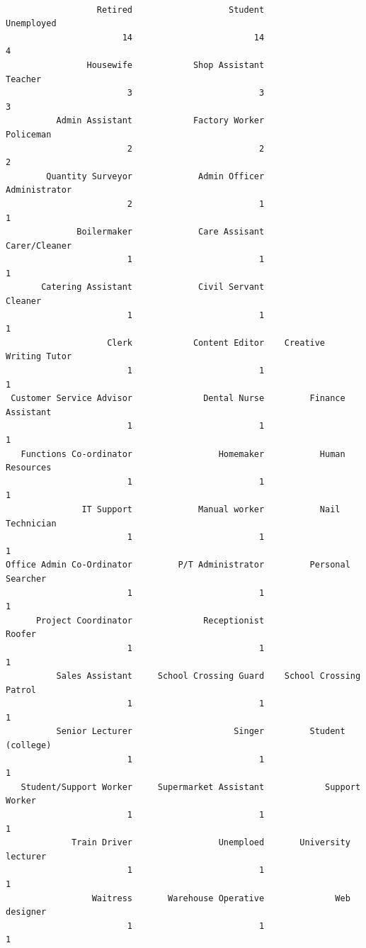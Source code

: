 \documentclass[
  letterpaper,
  DIV=11,
  numbers=noendperiod]{scrreprt}
\begin{document}
\begin{verbatim}

                  Retired                   Student                Unemployed 
                       14                        14                         4 
                Housewife            Shop Assistant                   Teacher 
                        3                         3                         3 
          Admin Assistant            Factory Worker                 Policeman 
                        2                         2                         2 
        Quantity Surveyor             Admin Officer             Administrator 
                        2                         1                         1 
              Boilermaker             Care Assisant             Carer/Cleaner 
                        1                         1                         1 
       Catering Assistant             Civil Servant                   Cleaner 
                        1                         1                         1 
                    Clerk            Content Editor    Creative Writing Tutor 
                        1                         1                         1 
 Customer Service Advisor              Dental Nurse         Finance Assistant 
                        1                         1                         1 
   Functions Co-ordinator                 Homemaker           Human Resources 
                        1                         1                         1 
               IT Support             Manual worker           Nail Technician 
                        1                         1                         1 
Office Admin Co-Ordinator         P/T Administrator         Personal Searcher 
                        1                         1                         1 
      Project Coordinator              Receptionist                    Roofer 
                        1                         1                         1 
          Sales Assistant     School Crossing Guard    School Crossing Patrol 
                        1                         1                         1 
          Senior Lecturer                    Singer         Student (college) 
                        1                         1                         1 
   Student/Support Worker     Supermarket Assistant            Support Worker 
                        1                         1                         1 
             Train Driver                 Unemploed       University lecturer 
                        1                         1                         1 
                 Waitress       Warehouse Operative              Web designer 
                        1                         1                         1 
\end{verbatim}
\end{document}
